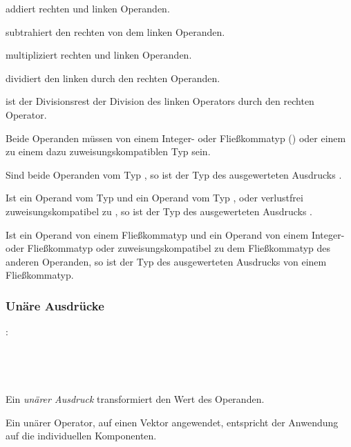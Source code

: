 \op{\plus} addiert rechten und linken Operanden.

\op{-} subtrahiert den rechten von dem linken Operanden.

\op{*} multipliziert rechten und linken Operanden.

\op{/} dividiert den linken durch den rechten Operanden.

\op{\%} ist der Divisionsrest der Division des linken Operators durch den rechten Operator.

Beide Operanden müssen von einem Integer- oder Fließkommatyp () oder einem
zu einem dazu zuweisungskompatiblen Typ sein.

Sind beide Operanden vom Typ , so ist der Typ des ausgewerteten Ausdrucks .

Ist ein Operand vom Typ  und ein Operand vom Typ ,  oder
verlustfrei zuweisungskompatibel zu , so ist der Typ des ausgewerteten Ausdrucks .

Ist ein Operand von einem Fließkommatyp und ein Operand von einem Integer- oder Fließkommatyp
oder zuweisungskompatibel zu dem Fließkommatyp des anderen Operanden,
so ist der Typ des ausgewerteten Ausdrucks von einem Fließkommatyp.


\subsubsection{Unäre Ausdrücke}\label{Unaere Ausdruecke}
:\label{asdr_unaer}\\
\hspace*{1cm}\Gt{$\sim$}\Gspace{} \\
\hspace*{1cm}\Gt{-}\Gspace{} \\
\hspace*{1cm}\Gt{!}\Gspace{} \\
\hspace*{1cm} \\

Ein \emph{unärer Ausdruck} transformiert den Wert des Operanden.

Ein unärer Operator, auf einen Vektor angewendet, entspricht der Anwendung auf die individuellen Komponenten.

